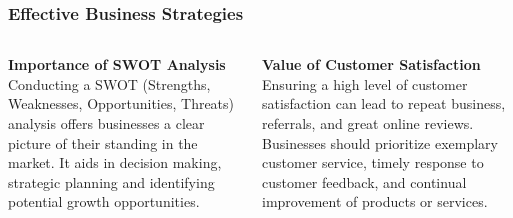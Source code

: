 \documentclass[5pt]{beamer}
\begin{document}
\begin{frame}
\frametitle{Effective Business Strategies}
\begin{columns}
\begin{column}{0.45\textwidth}
\begin{block}{\textbf{Importance of SWOT Analysis}}
Conducting a SWOT (Strengths, Weaknesses, Opportunities, Threats) analysis offers businesses a clear picture of their standing in the market. It aids in decision making, strategic planning and identifying potential growth opportunities.
\end{block}
\end{column}
\begin{column}{0.45\textwidth}
\begin{block}{\textbf{Value of Customer Satisfaction}}
Ensuring a high level of customer satisfaction can lead to repeat business, referrals, and great online reviews. Businesses should prioritize exemplary customer service, timely response to customer feedback, and continual improvement of products or services.
\end{block}
\end{column}
\end{columns}
\end{frame}
\end{document}
